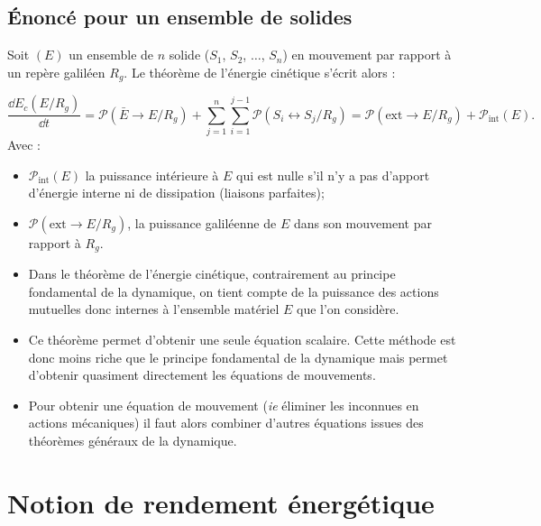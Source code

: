 \documentclass[10pt,fleqn]{article} %
\begin{document}
\subsection{Énoncé pour un ensemble de solides}

\begin{theorem}
Soit $(E)$ un ensemble de $n$ solide ($S_1$, $S_2$, $\ldots$, $S_n$) en mouvement par rapport à un repère galiléen $R_g$. Le théorème de l'énergie cinétique s'écrit alors :

$$
\frac{\dd E_c(E/R_g)}{\dd t}=\mathcal{P}(\bar E \rightarrow E/R_g)+ \displaystyle{\sum^n_{j=1}}\displaystyle{\sum^{j-1}_{i=1}}\mathcal{P}(S_i \leftrightarrow S_j/R_g)=\mathcal{P}(\text{ext}\rightarrow E/R_g)+\mathcal{P}_{\text{int}}(E).
$$
Avec :
\begin{itemize}
\item $\mathcal{P}_{\text{int}}(E)$ la puissance intérieure à $E$ qui est nulle s'il n'y a pas d'apport d'énergie interne ni de dissipation (liaisons parfaites);
\item $\mathcal{P}(\text{ext}\rightarrow E/R_g)$, la puissance galiléenne de $E$ dans son mouvement par rapport à $R_g$.
\end{itemize}

\end{theorem}

\begin{rem}%
\begin{itemize}
\item Dans le théorème de l'énergie cinétique, contrairement au principe fondamental de la dynamique, on tient compte de la puissance des actions mutuelles donc internes à l'ensemble matériel $E$ que l'on considère.
\item Ce théorème permet d'obtenir une seule équation scalaire. Cette méthode est donc moins riche que le principe fondamental de la dynamique mais permet d'obtenir quasiment directement les équations de mouvements.
\item Pour obtenir une équation de mouvement (\textit{ie} éliminer les inconnues en actions mécaniques) il faut alors combiner d'autres équations issues des théorèmes généraux de la dynamique.
\end{itemize}
\end{rem}%


\section{Notion de rendement énergétique}
\end{document}
